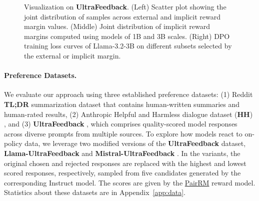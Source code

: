 \begin{figure*}[t]
        \vspace{-10pt}
	\centering
        \vspace{-10pt}
	\caption{Visualization on \textbf{UltraFeedback}. (Left) Scatter plot showing the joint distribution of samples across external and implicit reward margin values. (Middle) Joint distribution of implicit reward margins computed using models of 1B and 3B scales. (Right) DPO training loss curves of Llama-3.2-3B on different subsets selected by the external or implicit margin.
	}
	\label{fig:visual}
	\vspace{-10pt}
\end{figure*}

\paragraph{Preference Datasets.} We evaluate our approach using three established preference datasets: (1) Reddit \textbf{TL;DR} summarization dataset \citep{volske2017tl,stiennon2020learning} that contains human-written summaries and human-rated results, (2) Anthropic Helpful and Harmless dialogue dataset (\textbf{HH}) \citep{bai2022training}, and (3) \textbf{UltraFeedback} \citep{cui2023ultrafeedback}, which comprises quality-scored model responses across diverse prompts from multiple sources. To explore how models react to on-policy data, we leverage two modified versions of the \textbf{UltraFeedback} dataset, \textbf{Llama-UltraFeedback} and \textbf{Mistral-UltraFeedback} \citep{meng2024simpo}. In the variants, the original chosen and rejected responses are replaced with the highest and lowest scored responses, respectively, sampled from five candidates generated by the corresponding Instruct model.  The scores are given by the \href{https://huggingface.co/llm-blender/PairRM}{PairRM} \citep{jiang2023llm} reward model. Statistics about these datasets are in Appendix~\ref{app:data}. 

